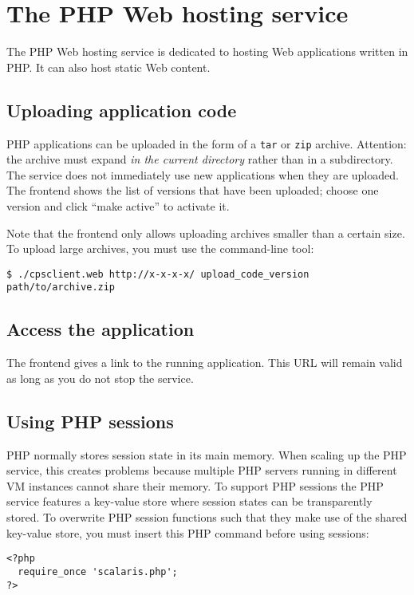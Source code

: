 \documentclass[10pt]{article}
\begin{document}
\section{The PHP Web hosting service}

The PHP Web hosting service is dedicated to hosting Web applications
written in PHP. It can also host static Web content.

\subsection{Uploading application code}

PHP applications can be uploaded in the form of a \texttt{tar} or
\texttt{zip} archive.  Attention: the archive must expand \emph{in the
  current directory} rather than in a subdirectory. The service does
not immediately use new applications when they are uploaded. The
frontend shows the list of versions that have been uploaded; choose
one version and click ``make active'' to activate it.

Note that the frontend only allows uploading archives smaller than a
certain size.  To upload large archives, you must use the command-line
tool:
\begin{verbatim}
$ ./cpsclient.web http://x-x-x-x/ upload_code_version path/to/archive.zip
\end{verbatim}

\subsection{Access the application}

The frontend gives a link to the running application. This URL will
remain valid as long as you do not stop the service.

\subsection{Using PHP sessions}

PHP normally stores session state in its main memory. When scaling up
the PHP service, this creates problems because multiple PHP servers
running in different VM instances cannot share their memory. To
support PHP sessions the PHP service features a key-value store where
session states can be transparently stored. To overwrite PHP session
functions such that they make use of the shared key-value store, you
must insert this PHP command before using sessions:

\begin{verbatim}
<?php
  require_once 'scalaris.php';
?>
\end{verbatim}
\end{document}
